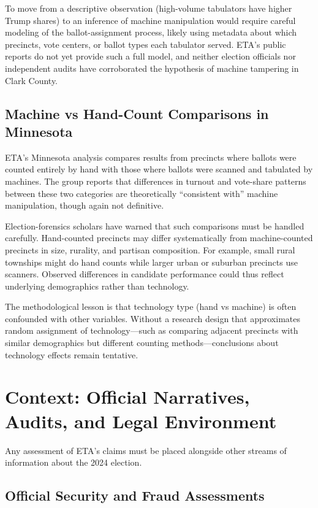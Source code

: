 \documentclass[12pt]{article}
\begin{document}
To move from a descriptive observation (high-volume tabulators have higher Trump shares) to an inference of machine manipulation would require careful modeling of the ballot-assignment process, likely using metadata about which precincts, vote centers, or ballot types each tabulator served. ETA's public reports do not yet provide such a full model, and neither election officials nor independent audits have corroborated the hypothesis of machine tampering in Clark County.

\subsection{Machine vs Hand-Count Comparisons in Minnesota}

ETA's Minnesota analysis compares results from precincts where ballots were counted entirely by hand with those where ballots were scanned and tabulated by machines. The group reports that differences in turnout and vote-share patterns between these two categories are theoretically \enquote{consistent with} machine manipulation, though again not definitive.

Election-forensics scholars have warned that such comparisons must be handled carefully. Hand-counted precincts may differ systematically from machine-counted precincts in size, rurality, and partisan composition. For example, small rural townships might do hand counts while larger urban or suburban precincts use scanners. Observed differences in candidate performance could thus reflect underlying demographics rather than technology.

The methodological lesson is that technology type (hand vs machine) is often confounded with other variables. Without a research design that approximates random assignment of technology---such as comparing adjacent precincts with similar demographics but different counting methods---conclusions about technology effects remain tentative.

\section{Context: Official Narratives, Audits, and Legal Environment}

Any assessment of ETA's claims must be placed alongside other streams of information about the 2024 election.

\subsection{Official Security and Fraud Assessments}
\end{document}
